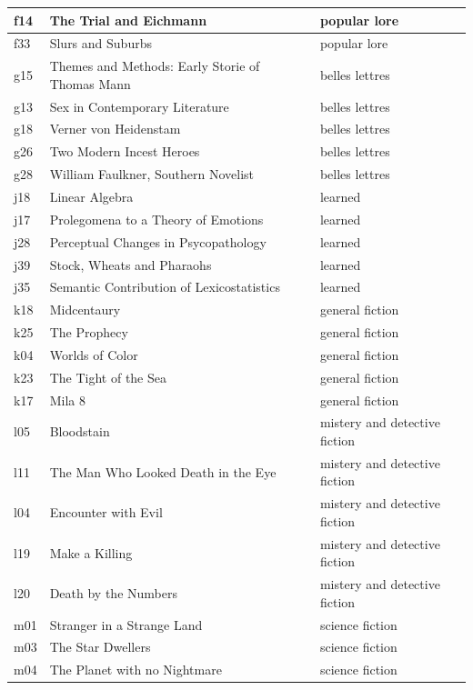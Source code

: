 \documentclass[12pt,letterpaper,twoside]{article}
\begin{document}
\begin{longtable}[c]{| p{} | p{} | p{}|}
        f14 & The Trial and Eichmann & popular lore  \\ \hline
        f33 & Slurs and Suburbs & popular lore  \\ \hline
        g15 & Themes and Methods: Early Storie of Thomas Mann & belles lettres  \\ \hline
        g13 & Sex in Contemporary Literature & belles lettres  \\ \hline
        g18 & Verner von Heidenstam & belles lettres  \\ \hline
        g26 & Two Modern Incest Heroes & belles lettres  \\ \hline
        g28 & William Faulkner, Southern Novelist & belles lettres \\ \hline
        j18 & Linear Algebra & learned  \\ \hline
        j17 & Prolegomena to a Theory of Emotions & learned  \\ \hline
        j28 & Perceptual Changes in Psycopathology & learned  \\ \hline
        j39 & Stock, Wheats and Pharaohs & learned \\ \hline
        j35 & Semantic Contribution of Lexicostatistics & learned  \\ \hline
        k18 & Midcentaury & general fiction  \\ \hline
        k25 & The Prophecy & general fiction  \\ \hline
        k04 & Worlds of Color & general fiction  \\ \hline
        k23 & The Tight of the Sea & general fiction  \\ \hline
        k17 & Mila 8 & general fiction  \\ \hline
        l05 & Bloodstain & mistery and detective fiction  \\ \hline
        l11 & The Man Who Looked Death in the Eye & mistery and detective fiction  \\ \hline
        l04 & Encounter with Evil & mistery and detective fiction  \\ \hline
        l19 & Make a Killing & mistery and detective fiction  \\ \hline
        l20 & Death by the Numbers & mistery and detective fiction  \\ \hline
        m01 & Stranger in a Strange Land & science fiction  \\ \hline
        m03 & The Star Dwellers & science fiction  \\ \hline
        m04 & The Planet with no Nightmare & science fiction  \\ \hline

\end{longtable}
\end{document}
